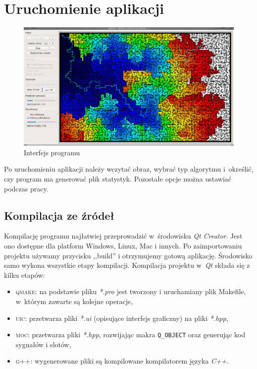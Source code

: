 \documentclass[11pt,a4paper,oneside]{mwart}
\begin{document}
\section{Uruchomienie aplikacji\label{sec_uruchomienie}}
\begin{figure}[!h]
\centering
\includegraphics[angle=0,width=1\textwidth]{img/gui.png}
\caption{Interfejs programu\label{gui}}
\end{figure}

Po uruchomieniu aplikacji należy wczytać obraz, wybrać typ algorytmu i~określić, 
czy program ma generować plik statystyk.
Pozostałe opcje można ustawiać podczas pracy.

\subsection{Kompilacja ze źródeł}
Kompilację programu najłatwiej przeprowadzić w~środowisku \emph{Qt Creator}. 
Jest ono dostępne dla platform Windows, Linux, Mac i innych.
Po zaimportowaniu projektu używamy przycisku ,,build'' i otrzymujemy gotową aplikację.
Środowisko samo wykona wszystkie etapy kompilacji.
Kompilacja projektu w~\emph{Qt} składa się z kilku etapów: 
\begin{itemize}
\item \textsc{qmake}: na podstawie pliku \emph{*.pro} jest tworzony i uruchamiany plik Makefile, 
w~którym zawarte są kolejne operacje,
\item \textsc{uic}: przetwarza pliki \emph{*.ui} (opisujące interfejs graficzny) na pliki \emph{*.hpp},
\item \textsc{moc}: przetwarza pliki \emph{*.hpp}, rozwijając makra \lstinline!Q_OBJECT! 
oraz generując kod sygnałów i slotów,
\item \textsc{g++}: wygenerowane pliki są kompilowane kompilatorem języka \emph{C++}.
\end{itemize}
\end{document}
